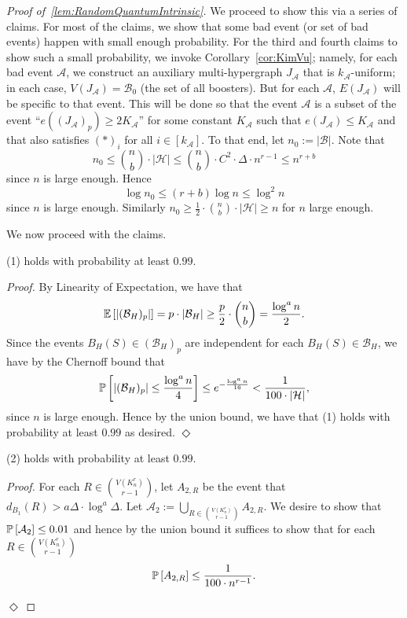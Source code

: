\documentclass[11pt]{article}
\newcommand{\mc}[1]{\mathcal{#1}}
\newcounter{i}
\theoremstyle{plain}
\newenvironment{proofclaim}[1][]%
{\noindent \emph{Proof.} {}{#1}{}}{\hfill
	$\Diamond$\vspace{1em}}
\renewcommand{\theclaim}{\thetheorem.\arabic{claim}}
\newenvironment{lateproof}[1]
 {%
  \renewcommand{\theclaim}{\ref{#1}.\arabic{claim}}%
  \begin{proof}[Proof of~\cref{#1}]%
 }
 {\end{proof}}
\theoremstyle{plain} %
\theoremstyle{definition}
\newcommand{\Prob}[1]{\ensuremath{%
\mathbb P\left[#1\right]
}}
\newcommand{\Expect}[1]{\ensuremath{%
\mathbb E\left[#1\right]
}}
\begin{document}
\begin{lateproof}{lem:RandomQuantumIntrinsic}
We proceed to show this via a series of claims. For most of the claims, we show that some bad event (or set of bad events) happen with small enough probability. For the third and fourth claims to show such a small probability, we invoke Corollary~\ref{cor:KimVu}; namely, for each bad event $\mathcal{A}$, we construct an auxiliary multi-hypergraph $J_{\mathcal{A}}$ that is $k_{\mathcal{A}}$-uniform; in each case, $V(J_{\mathcal{A}}) = \mathcal{B}_0$ (the set of all boosters). But for each $\mathcal{A}$, $E(J_{\mathcal{A}})$ will be specific to that event. This will be done so that the event $\mathcal{A}$ is a subset of the event ``$e((J_{\mathcal{A}})_p) \ge 2K_{\mathcal{A}}$'' for some constant $K_{\mathcal{A}}$ such that $e(J_{\mathcal{A}}) \le K_{\mc{A}}$ and that also satisfies $(*)_i$ for all $i\in [k_{\mc{A}}]$. To that end, let $n_0 := |\mathcal{B}|$. Note that 
$$n_0 \le \binom{n}{b} \cdot |\mc{H}| \le \binom{n}{b} \cdot C^2 \cdot \Delta \cdot n^{r-1} \le n^{r+b}$$
since $n$ is large enough. Hence
$$\log n_0 \le (r+b) \log n \le \log^2 n$$
since $n$ is large enough. Similarly $n_0 \ge \frac{1}{2} \cdot \binom{n}{b}\cdot |\mc{H}| \ge n$ for $n$ large enough.

We now proceed with the claims.

\begin{claim}\label{cl:1Holds}
(1) holds with probability at least $0.99$.    
\end{claim}
\begin{proofclaim}
By Linearity of Expectation, we have that $$\Expect{|(\mc{B}_{H})_p|} = p\cdot |\mathcal{B}_{H}| \ge  \frac{p}{2} \cdot \binom{n}{b} = \frac{\log^{a} n}{2}.$$
Since the events $B_H(S) \in (\mc{B}_{H})_p$ are independent for each $B_H(S) \in \mathcal{B}_{H}$, we have by the Chernoff bound that 
$$\Prob{|(\mc{B}_{H})_p| \le \frac{\log^{a} n}{4}} \le e^{-\frac{\log^{a} n}{16} } < \frac{1}{100 \cdot |\mathcal{H}|},$$
since $n$ is large enough. Hence by the union bound, we have that (1) holds with probability at least $0.99$ as desired.
\end{proofclaim}


\begin{claim}\label{cl:2Holds}
(2) holds with probability at least $0.99$.    
\end{claim}
\begin{proofclaim}
For each $R\in \binom{V(K_n^r)}{r-1}$, let $A_{2,R}$ be the event that $d_{B_1}(R) > a\Delta \cdot \log^{a} \Delta$. Let $\mathcal{A}_2 := \bigcup_{R\in \binom{V(K_n^r)}{r-1}} A_{2,R}$. We desire to show that $\Prob{\mc{A}_2} \le 0.01$ and hence by the union bound it suffices to show that for each $R\in \binom{V(K_n^r)}{r-1}$
$$\Prob{A_{2,R}} \le \frac{1}{100\cdot n^{r-1}}.$$


\end{proofclaim}
\end{lateproof}
\end{document}

